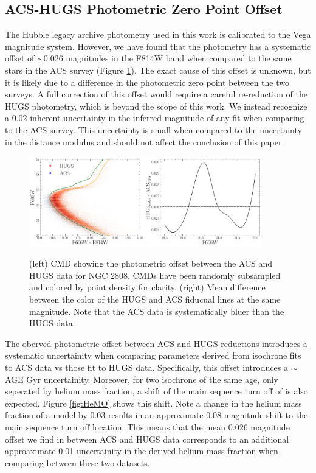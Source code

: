 \subsection{ACS-HUGS Photometric Zero Point Offset}
The Hubble legacy archive photometry used in this work is calibrated to the
Vega magnitude system. However, we have found that the photometry has a
systematic offset of $\sim0.026$ magnitudes in the F814W band when
compared to the same stars in the ACS survey (Figure \ref{fig:offset}). The
exact cause of this offset is unknown, but it is likely due to a difference in
the photometric zero point between the two surveys. A full correction of this
offset would require a careful re-reduction of the HUGS photometry, which is
beyond the scope of this work. We instead recognize a 0.02 inherent uncertainty
in the inferred magnitude of any fit when comparing to the ACS survey. This
uncertainty is small when compared to the uncertainty in the
distance modulus and should not affect the conclusion of this
paper. 

\begin{figure}
  \centering
  \includegraphics[width=0.90\textwidth]{figures/ngc2808/photometricOffset.pdf}
  \label{fig:offset}
  \caption{(left) CMD showing the photometric offset between the ACS and HUGS data for NGC 2808. CMDs have been randomly subsampled and colored by point density for clarity. (right) Mean difference between the color of the HUGS and ACS fiducual lines at the same magnitude. Note that the ACS data is systematically bluer than the HUGS data.}
\end{figure}

The oberved photometric offset between ACS and HUGS reductions introduces a
systematic uncertainity when comparing parameters derived from isochrone fits
to ACS data vs those fit to HUGS data. Specifically, this offset introduces a
{\color{red}$\sim$AGE Gyr} uncertainity. Moreover, for two isochrone of the
same age, only seperated by helium mass fraction, a shift of the main sequence
turn off of is also expected. Figure \ref{fig:HeMO} shows this shift. Note a change in the helium mass fraction of a model by 0.03 results in an approximate 0.08 magnitude shift to the main sequence turn off location. This means that the mean 0.026 magnitude offset we find in between ACS and HUGS data corresponds to an additional approaximate 0.01 uncertainity in the derived helium mass fraction when comparing between these two datasets. 

